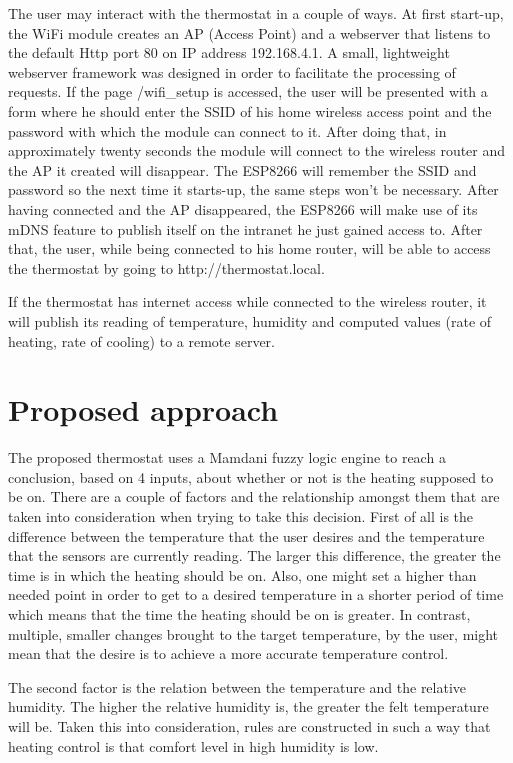\documentclass[conference]{IEEEtran}
\let\Oldsection\section
\renewcommand{\section}{\FloatBarrier\Oldsection}
\begin{document}
The user may interact with the thermostat in a couple of ways.
At first start-up, the WiFi module creates an AP (Access Point) and a webserver that listens to the default Http port 80
on IP address 192.168.4.1. A small, lightweight webserver framework was designed in order to facilitate the 
processing of requests.
If the page /wifi\_setup is accessed, the user will be presented with a form
where he should enter the SSID of his home wireless access point and the password with which the module
can connect to it. After doing that, in approximately twenty seconds the module will connect to the wireless
router and the AP it created will disappear. The ESP8266 will remember the SSID and password so the next time
it starts-up, the same steps won't be necessary.
After having connected and the AP disappeared, the ESP8266 will make use of its mDNS feature to publish itself
on the intranet he just gained access to. After that, the user, while being connected to his home router, will 
be able to access the thermostat by going to http://thermostat.local.

If the thermostat has internet access while connected to the wireless router, it will publish its reading of
temperature, humidity and computed values (rate of heating, rate of cooling) to a remote server.

\section{Proposed approach}

The proposed thermostat uses a Mamdani fuzzy logic engine to reach a conclusion, based on 4 inputs, about
whether or not is the heating supposed to be on.
There are a couple of factors and the relationship amongst them that are taken into consideration when trying to
take this decision. First of all is the difference between the temperature that the user desires and the temperature
that the sensors are currently reading. The larger this difference, the greater the time is in which the heating
should be on. Also, one might set a higher than needed point in order to get to a desired temperature in a shorter
period of time which means that the time the heating should be on is greater. In contrast, multiple, smaller
changes brought to the target temperature, by the user, might mean that the desire is to achieve a more accurate
temperature control.

The second factor is the relation between the temperature and the relative humidity. The higher the relative 
humidity is, the greater the felt temperature will be. Taken this into consideration, rules are constructed
in such a way that heating control is  that comfort level in high humidity is low.
\end{document}
